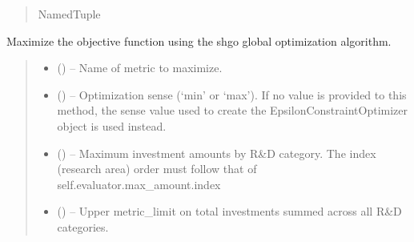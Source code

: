 \documentclass[letterpaper,10pt,english]{sphinxmanual}
\begin{document}
\begin{fulllineitems}
\begin{fulllineitems}
\begin{quote}
\begin{description}
\sphinxAtStartPar
NamedTuple

\end{description}\end{quote}

\end{fulllineitems}


\begin{fulllineitems}
\label{\detokenize{tyche:tyche.EpsilonConstraints.EpsilonConstraintOptimizer.opt_shgo}}
\pysigstartsignatures
{}
\pysigstopsignatures
\sphinxAtStartPar
Maximize the objective function using the shgo global optimization
algorithm.
\begin{quote}\begin{description}
\begin{itemize}
\item {} 
\sphinxAtStartPar
{} () – Name of metric to maximize.

\item {} 
\sphinxAtStartPar
{} () – Optimization sense (‘min’ or ‘max’). If no value is provided to
this method, the sense value used to create the
EpsilonConstraintOptimizer object is used instead.

\item {} 
\sphinxAtStartPar
{} () – Maximum investment amounts by R\&D category. The index (research area)
order must follow that of self.evaluator.max\_amount.index

\item {} 
\sphinxAtStartPar
{} () – Upper metric\_limit on total investments summed across all R\&D categories.


\end{itemize}
\end{description}
\end{quote}
\end{fulllineitems}
\end{fulllineitems}
\end{document}
